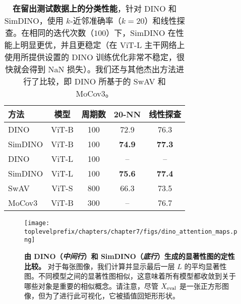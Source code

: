 \documentclass[../../book-main.tex]{subfiles}
\begin{document}
\begin{table}
    \centering
    \begin{tabular}{@{}lcccc@{}} %
        \toprule
        方法 & 模型 & 周期数 & 20-NN & 线性探查
        \\
        \midrule 
        DINO & ViT-B & 100 & 72.9 & 76.3 \\
        SimDINO & ViT-B & 100 & \bf 74.9 & \bf 77.3 \\
        DINO & ViT-L & 100 & -- & -- \\
        SimDINO & ViT-L & 100 & \bf 75.6 & \bf 77.4 \\
        \midrule
        \color{gray} SwAV & \color{gray} ViT-S & \color{gray} 800 & \color{gray} 66.3 & \color{gray} 73.5 \\
        \color{gray} MoCov3 & \color{gray} ViT-B & \color{gray} 300  & \color{gray} -- & \color{gray} 76.7 \\
        \bottomrule
    \end{tabular}
    \caption{\small\textbf{在留出测试数据上的分类性能}，针对 DINO 和 SimDINO，使用 \(k\)-近邻准确率（\(k = 20\)）和线性探查。在相同的迭代次数（\(100\)）下，SimDINO 在性能上明显更优，并且更稳定（在 ViT-L 主干网络上使用所提供设置的 DINO 训练优化非常不稳定，很快就会得到 NaN 损失）。我们还与其他杰出方法进行了比较，即 DINO 所基于的 SwAV 和 MoCov3。}
    \label{tab:dino_imagenet_linear_probing}
\end{table}

\begin{figure}
    \centering 
    \texttt{[image: \\toplevelprefix/chapters/chapter7/figs/dino\_attention\_maps.png]}
    \caption{\small\textbf{由 DINO（\textit{中间行}）和 SimDINO（\textit{底行}）生成的显著性图的定性比较。} 对于每张图像，我们计算并显示最后一层 \(L\) 的平均显著性图。不同模型之间的显著性图相似，这意味着所有模型都收敛到关于哪些对象是重要的相似概念。请注意，尽管 \(X_{\mathrm{eval}}\) 是一张正方形图像，但为了进行此可视化，它被插值回矩形形状。}
    \label{fig:dino_attention_maps_saliency}
\end{figure}
\end{document}
